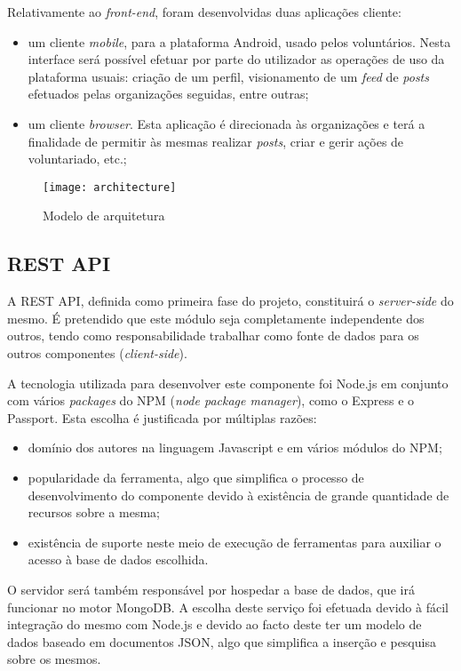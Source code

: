 Relativamente ao \textit{front-end}, foram desenvolvidas duas aplicações cliente: 
\begin{itemize}
	\item um cliente \textit{mobile}, para a plataforma Android, usado pelos voluntários. Nesta interface será possível efetuar por parte do utilizador as operações de uso da plataforma usuais: criação de um perfil, visionamento de um \textit{feed} de \textit{posts} efetuados pelas organizações seguidas, entre outras;
	\item um cliente \textit{browser}. Esta aplicação é direcionada às organizações e terá a finalidade de permitir às mesmas realizar \textit{posts}, criar e gerir ações de voluntariado, etc.;
\end{itemize}

\begin{figure}[h]
	\centering
	\texttt{[image: architecture]}
	\caption{Modelo de arquitetura}
\end{figure}


\subsection{REST API}
A REST API, definida como primeira fase do projeto, constituirá o \textit{server-side} do mesmo. É pretendido que este módulo seja completamente independente dos outros, tendo como responsabilidade trabalhar como fonte de dados para os outros componentes (\textit{client-side}). \par \medskip 

A tecnologia utilizada para desenvolver este componente foi Node.js em conjunto com vários \textit{packages} do NPM (\textit{node package manager}), como o Express e o Passport. Esta escolha é justificada por múltiplas razões:
\begin{itemize}
	\item domínio dos autores na linguagem Javascript e em vários módulos do NPM;
	\item popularidade da ferramenta, algo que simplifica o processo de desenvolvimento do componente devido à existência de grande quantidade de recursos sobre a mesma;
	\item existência de suporte neste meio de execução de ferramentas para auxiliar o acesso à base de dados escolhida.
\end{itemize}
\par \medskip

O servidor será também responsável por hospedar a base de dados, que irá funcionar no motor MongoDB. A escolha deste serviço foi efetuada devido à fácil integração do mesmo com Node.js e devido ao facto deste ter um modelo de dados baseado em documentos JSON, algo que simplifica a inserção e pesquisa sobre os mesmos.
\par \medskip

